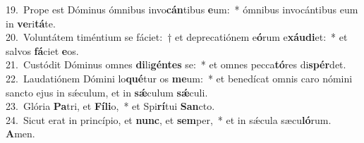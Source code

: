 {19.~}Prope est Dóminus ómnibus invo\textbf{cán}tibus \textbf{e}um:~* ómnibus invocántibus eum in \textbf{ve}ri\textbf{tá}te.\\
{20.~}Voluntátem timéntium se fáciet:~† et deprecatiónem e\textbf{ó}rum e\textbf{xáu}\textbf{di}et:~* et salvos \textbf{fá}ciet \textbf{e}os.\\
{21.~}Custódit Dóminus omnes \textbf{di}li\textbf{gén}\textbf{tes} se:~* et omnes pecca\textbf{tó}res di\textbf{spér}det.\\
{22.~}Laudatiónem Dómini lo\textbf{qué}tur os \textbf{me}um:~* et benedícat omnis caro nómini sancto ejus in sǽculum, et in \textbf{sǽ}culum \textbf{sǽ}culi.\\
{23.~}Glória \textbf{Pa}tri, et \textbf{Fí}\textbf{li}o,~* et Spi\textbf{rí}tui \textbf{San}cto.\\
{24.~}Sicut erat in princípio, et \textbf{nunc}, et \textbf{sem}per,~* et in sǽcula sæcu\textbf{ló}rum. \textbf{A}men.\\
